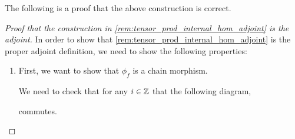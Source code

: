 The following is a proof that the above construction is correct.
\begin{proof}[Proof that the construction in \autoref{rem:tensor_prod_internal_hom_adjoint} is the adjoint]\phantom{hei}
    
    In order to show that \autoref{rem:tensor_prod_internal_hom_adjoint} is the proper adjoint definition, we need to show the following properties:
    \begin{enumerate}
        \item {
            First, we want to show that \( \phi_f \) is a chain morphism.

            We need to check that for any \( i \in {\mathbb{Z}} \) that the following diagram,
            \begin{center}
            \end{center}
            commutes.

}
\end{enumerate}
\end{proof}
